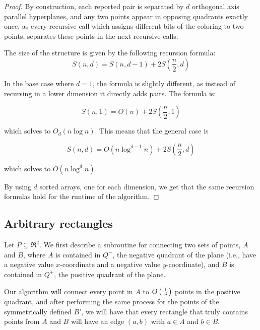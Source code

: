 \documentclass[12pt]{article}%
\begin{document}
\begin{proof}
    By construction, each reported pair is separated by $d$ orthogonal
    axis parallel hyperplanes, and any two points appear in opposing
    quadrants exactly once, as every recursive call which assigns
    different bits of the coloring to two points, separates these
    points in the next recursive calls.
	
    The size of the structure is given by the following recursion
    formula:
    \begin{equation}
        S(n,d) = S(n,d-1) + 2S\left(\frac{n}{2},d\right)
    \end{equation}
	
    In the base case where $d=1$, the formula is slightly different,
    as instead of recursing in a lower dimension it directly adds
    pairs. The formula is:
	
	\begin{equation}
            S(n,1) = O(n) + 2S\left(\frac{n}{2},1\right)
        \end{equation}
	
	which solves to $O_d(n\log n)$. This means that the general
        case is
	
	\begin{equation}
            S(n,d) = O(n\log^{d-1}n) + 2S\left(\frac{n}{2},d\right)
        \end{equation}
	
	which solves to $O(n\log^d n)$.
	
	By using $d$ sorted arrays, one for each dimension, we get
        that the same recursion formulas hold for the runtime of the
        algorithm.
    \end{proof}

    \subsection{Arbitrary rectangles}

    Let $P\subseteq \Re^2$. We first describe a subroutine for
    connecting two sets of points, $A$ and $B$, where $A$ is contained
    in $Q^-$, the negative quadrant of the plane (i.e., have a
    negative value $x$-coordinate and a negative value
    $y$-coordinate), and $B$ is contained in $Q^+$, the positive
    quadrant of the plane.

    Our algorithm will connect every point in $A$ to
    $O\left(\frac{1}{\varepsilon^2}\right)$ points in the positive quadrant,
    and after performing the same process for the points of the
    symmetrically defined $B'$, we will have that every rectangle that
    truly contains points from $A$ and $B$ will have an edge $(a,b)$
    with $a\in A$ and $b\in B$.
\end{document}
